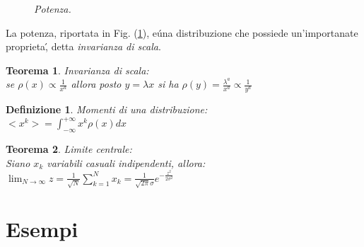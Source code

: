 \documentclass[12pt, a4paper]{book}
\theoremstyle{theorem}
\newtheorem{definition}{Definizione}[section]
\newtheorem{theorem}{Teorema}[section]
\begin{document}
		\begin{figure}[H]
			\centering
			\caption{\emph{Potenza.}}
			\label{figure:potenza}
		\end{figure}
		La potenza, riportata in Fig. (\ref{figure:potenza}), e\' una distribuzione che possiede un'importanate proprieta\', detta \emph{invarianza di scala}.
		\begin{theorem}
			Invarianza di scala:\\
			se $\rho(x)\propto\frac{1}{x^a}$ allora posto $y=\lambda x$ si ha $\rho(y)=\frac{\lambda^a}{x^a}\propto\frac{1}{y^a}$
		\end{theorem}
		\begin{definition}
			Momenti di una distribuzione:\\
			$<x^k>=\int_{-\infty}^{+\infty}x^k\rho(x)dx$
		\end{definition}
		\begin{theorem}
			Limite centrale:\\
			Siano ${x_k}$ variabili casuali indipendenti, allora:\\
			$\lim_{N\to\infty}z=\frac{1}{\sqrt{N}}\sum_{k=1}^{N}x_k=\frac{1}{\sqrt{2\pi}\sigma}e^{-\frac{z^2}{2\sigma^2}}$
		\end{theorem}

		\section{Esempi}
\end{document}
